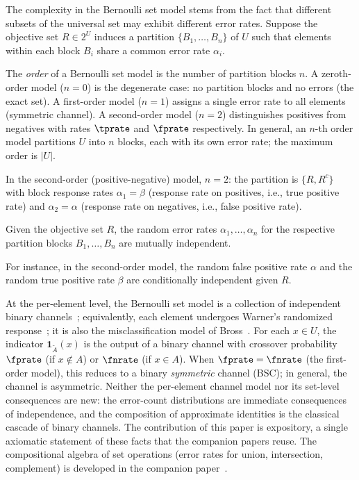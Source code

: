 The complexity in the Bernoulli set model stems from the fact that different subsets of the universal set may exhibit different error rates.
Suppose the objective set $R \in 2^U$ induces a partition $\{B_1, \ldots, B_n\}$ of $U$ such that elements within each block $B_i$ share a common error rate $\alpha_i$.
\begin{definition}
\label{def:model_order}
The \emph{order} of a Bernoulli set model is the number of partition blocks $n$.
A zeroth-order model ($n = 0$) is the degenerate case: no partition blocks and no errors (the exact set).
A first-order model ($n = 1$) assigns a single error rate to all elements (symmetric channel).
A second-order model ($n = 2$) distinguishes positives from negatives with rates $\tprate$ and $\fprate$ respectively.
In general, an $n$-th order model partitions $U$ into $n$ blocks, each with its own error rate; the maximum order is $|U|$.
\end{definition}
In the second-order (positive-negative) model, $n = 2$: the partition is $\{R, R^c\}$ with block response rates $\alpha_1 = \beta$ (response rate on positives, i.e., true positive rate) and $\alpha_2 = \alpha$ (response rate on negatives, i.e., false positive rate).
\begin{axiom}
\label{asm:fpr_fnr_r_indep}
Given the objective set $R$, the random error rates $\alpha_1, \ldots, \alpha_n$ for the respective partition blocks $B_1, \ldots, B_n$ are mutually independent.
\end{axiom}
For instance, in the second-order model, the random false positive rate $\alpha$ and the random true positive rate $\beta$ are conditionally independent given $R$.

\begin{remark}
\label{rem:bsc}
At the per-element level, the Bernoulli set model is a collection of independent binary channels~\cite{shannonBSC}; equivalently, each element undergoes Warner's randomized response~\cite{warner1965}; it is also the misclassification model of Bross~\cite{bross1954misclassification}. For each $x \in U$, the indicator $\mathbf{1}_{\tilde{A}}(x)$ is the output of a binary channel with crossover probability $\fprate$ (if $x \notin A$) or $\fnrate$ (if $x \in A$).
When $\fprate = \fnrate$ (the first-order model), this reduces to a binary \emph{symmetric} channel (BSC); in general, the channel is asymmetric.
Neither the per-element channel model nor its set-level consequences are new: the error-count distributions are immediate consequences of independence, and the composition of approximate identities is the classical cascade of binary channels.
The contribution of this paper is expository, a single axiomatic statement of these facts that the companion papers reuse.
The compositional algebra of set operations (error rates for union, intersection, complement) is developed in the companion paper~\cite{bernoulliComposition}.
\end{remark}

